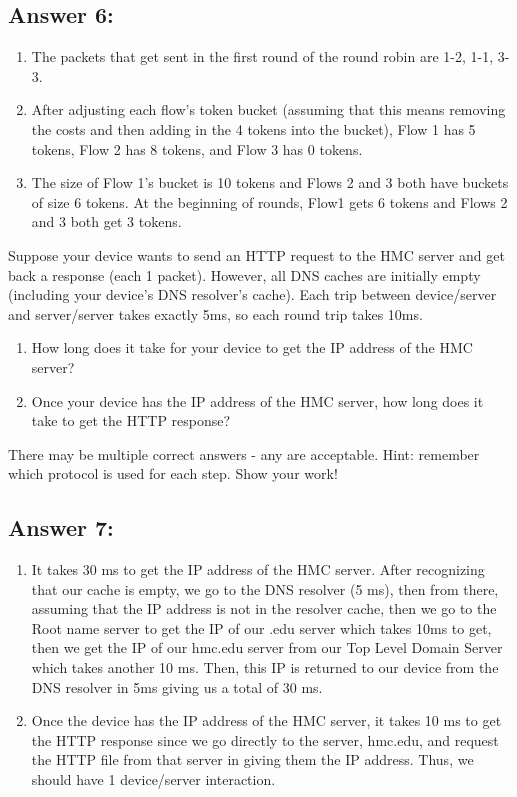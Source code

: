 \documentclass[10pt]{article}
\newenvironment{problem}[2][]{\begin{trivlist}
\item[\hskip \labelsep {\bfseries #1}\hskip \labelsep {\bfseries #2.}]}{\end{trivlist}}
\begin{document}
\subsection*{Answer 6:}
\begin{enumerate}
  \item The packets that get sent in the first round of the round robin are 1-2, 1-1, 3-3.
  \item After adjusting each flow's token bucket (assuming that this means removing the costs and then adding in the 4 tokens into the bucket), Flow 1 has 5 tokens, Flow 2 has 8 tokens, and Flow 3 has 0 tokens.
  \item The size of Flow 1's bucket is 10 tokens and Flows 2 and 3 both have buckets of size 6 tokens. At the beginning of rounds, Flow1 gets 6 tokens and Flows 2 and 3 both get 3 tokens.
\end{enumerate}


\begin{problem}{7: DNS lookups}
Suppose your device wants to send an HTTP request to the HMC server and get back a response (each 1 packet). However, all DNS caches are initially empty (including your device’s DNS resolver's cache). Each trip between device/server and server/server takes exactly 5ms, so each round trip takes 10ms.

\begin{enumerate}
    \item How long does it take for your device to get the IP address of the HMC server? 
    \item Once your device has the IP address of the HMC server, how long does it take to get the HTTP response?
\end{enumerate}

There may be multiple correct answers - any are acceptable. Hint: remember which protocol is used for each step. Show your work!
    
\end{problem}
\subsection*{Answer 7:}
\begin{enumerate}
  \item It takes 30 ms to get the IP address of the HMC server. After recognizing that our cache is empty, we go to the DNS resolver (5 ms), then from there, assuming that the IP address is not in the resolver cache, then we go to the Root name server to get the IP of our .edu server which takes 10ms to get, then we get the IP of our hmc.edu server from our Top Level Domain Server which takes another 10 ms. Then, this IP is returned to our device from the DNS resolver in 5ms giving us a total of 30 ms.
  \item Once the device has the IP address of the HMC server, it takes 10 ms to get the HTTP response since we go directly to the server, hmc.edu, and request the HTTP file from that server in giving them the IP address. Thus, we should have 1 device/server interaction.
\end{enumerate}
\end{document}
